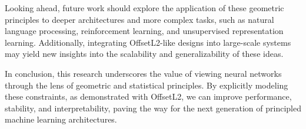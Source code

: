 Looking ahead, future work should explore the application of these geometric principles to deeper architectures and more complex tasks, such as natural language processing, reinforcement learning, and unsupervised representation learning. Additionally, integrating OffsetL2-like designs into large-scale systems may yield new insights into the scalability and generalizability of these ideas.

In conclusion, this research underscores the value of viewing neural networks through the lens of geometric and statistical principles. By explicitly modeling these constraints, as demonstrated with OffsetL2, we can improve performance, stability, and interpretability, paving the way for the next generation of principled machine learning architectures.
